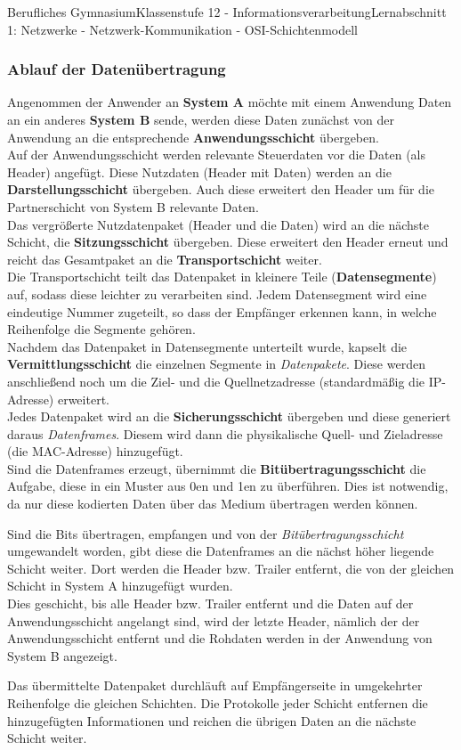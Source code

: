 \documentclass[11pt,oneside,openany,headings=optiontotoc,11pt,numbers=noenddot]{article}
\begin{document}
\begin{worksheet}{Berufliches Gymnasium}{Klassenstufe 12 - Informationsverarbeitung}{Lernabschnitt 1: Netzwerke - Netzwerk-Kommunikation - OSI-Schichtenmodell}
		\subsubsection{Ablauf der Datenübertragung}
		Angenommen der Anwender an \textbf{System A} möchte mit einem Anwendung Daten an ein anderes \textbf{System B} sende, werden diese Daten zunächst von der Anwendung an die entsprechende \textbf{Anwendungsschicht} übergeben.\\
		Auf der Anwendungsschicht werden relevante Steuerdaten vor die Daten (als Header) angefügt. Diese Nutzdaten (Header mit Daten) werden an die \textbf{Darstellungsschicht} übergeben. Auch diese erweitert den Header um für die Partnerschicht von System B relevante Daten.\\
		Das vergrößerte Nutzdatenpaket (Header und die Daten) wird an die nächste Schicht, die \textbf{Sitzungsschicht} übergeben. Diese erweitert den Header erneut und reicht das Gesamtpaket an die \textbf{Transportschicht} weiter.\\
		Die Transportschicht teilt das Datenpaket in kleinere Teile (\textbf{Datensegmente}) auf, sodass diese leichter zu verarbeiten sind. Jedem Datensegment wird eine eindeutige Nummer zugeteilt, so dass der Empfänger erkennen kann, in welche Reihenfolge die Segmente gehören.\\
		Nachdem das Datenpaket in Datensegmente unterteilt wurde, kapselt die \textbf{Vermittlungsschicht} die einzelnen Segmente in \textit{Datenpakete}. Diese werden anschließend noch um die Ziel- und die Quellnetzadresse (standardmäßig die IP-Adresse) erweitert.\\
		Jedes Datenpaket wird an die \textbf{Sicherungsschicht} übergeben und diese generiert daraus \textit{Datenframes}. Diesem wird dann die physikalische Quell- und Zieladresse (die MAC-Adresse) hinzugefügt.\\
		Sind die Datenframes erzeugt, übernimmt die \textbf{Bitübertragungsschicht} die Aufgabe, diese in ein Muster aus 0en und 1en zu überführen. Dies ist notwendig, da nur diese kodierten Daten über das Medium übertragen werden können.\\
		\par\noindent
		Sind die Bits übertragen, empfangen und von der \textit{Bitübertragungsschicht} umgewandelt worden, gibt diese die Datenframes an die nächst höher liegende Schicht weiter. Dort werden die Header bzw. Trailer entfernt, die von der gleichen Schicht in System A hinzugefügt wurden.\\
		Dies geschicht, bis alle Header bzw. Trailer entfernt und die Daten auf der Anwendungsschicht angelangt sind, wird der letzte Header, nämlich der der Anwendungsschicht entfernt und die Rohdaten werden in der Anwendung von System B angezeigt.
		\begin{framed}
			\noindent
			Das übermittelte Datenpaket durchläuft auf Empfängerseite in umgekehrter Reihenfolge die gleichen Schichten. Die Protokolle jeder Schicht entfernen die hinzugefügten Informationen und reichen die übrigen Daten an die nächste Schicht weiter.
		\end{framed}

\end{worksheet}
\end{document}
